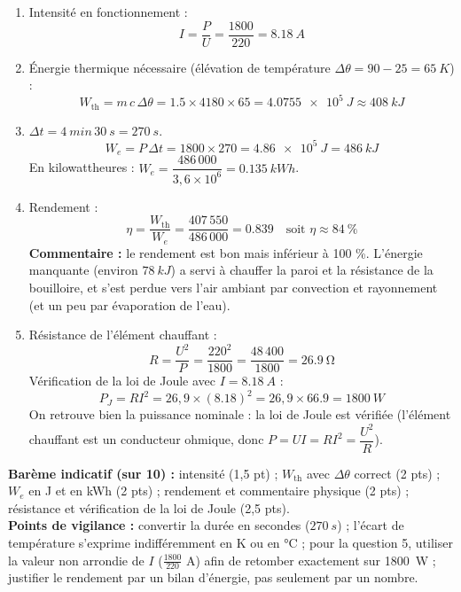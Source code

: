 \documentclass[11pt]{article}
\begin{document}
\begin{corrige}
\begin{enumerate}
\item Intensité en fonctionnement :
\[
I = \frac{P}{U} = \frac{1800}{220} = \SI{8,18}{A}
\]
\item Énergie thermique nécessaire (élévation de température $\Delta\theta = 90 - 25 = \SI{65}{K}$) :
\[
W_{\text{th}} = m\,c\,\Delta\theta = \num{1,5} \times 4180 \times 65 = \SI{4,0755e5}{J} \approx \SI{408}{kJ}
\]
\item $\Delta t = \SI{4}{min}\,\SI{30}{s} = \SI{270}{s}$.
\[
W_e = P\,\Delta t = 1800 \times 270 = \SI{4,86e5}{J} = \SI{486}{kJ}
\]
En kilowattheures : $W_e = \dfrac{486\,000}{3,6 \times 10^6} = \SI{0,135}{kWh}$.
\item Rendement :
\[
\eta = \frac{W_{\text{th}}}{W_e} = \frac{407\,550}{486\,000} = \num{0,839} \quad \text{soit } \eta \approx \SI{84}{\%}
\]
\textbf{Commentaire :} le rendement est bon mais inférieur à 100 \%. L'énergie manquante (environ $\SI{78}{kJ}$) a servi à chauffer la paroi et la résistance de la bouilloire, et s'est perdue vers l'air ambiant par convection et rayonnement (et un peu par évaporation de l'eau).
\item Résistance de l'élément chauffant :
\[
R = \frac{U^2}{P} = \frac{220^2}{1800} = \frac{48\,400}{1800} = \SI{26,9}{\ohm}
\]
Vérification de la loi de Joule avec $I = \SI{8,18}{A}$ :
\[
P_J = R I^2 = 26,9 \times (\num{8,18})^2 = 26,9 \times \num{66,9} = \SI{1800}{W}
\]
On retrouve bien la puissance nominale : la loi de Joule est vérifiée (l'élément chauffant est un conducteur ohmique, donc $P = U I = R I^2 = \dfrac{U^2}{R}$).
\end{enumerate}
\textbf{Barème indicatif (sur 10) :} intensité (1,5 pt) ; $W_{\text{th}}$ avec $\Delta\theta$ correct (2 pts) ; $W_e$ en J et en kWh (2 pts) ; rendement et commentaire physique (2 pts) ; résistance et vérification de la loi de Joule (2,5 pts).\\
\textbf{Points de vigilance :} convertir la durée en secondes ($\SI{270}{s}$) ; l'écart de température s'exprime indifféremment en K ou en \si{\celsius} ; pour la question 5, utiliser la valeur non arrondie de $I$ ($\tfrac{1800}{220}$ A) afin de retomber exactement sur \SI{1800}{W} ; justifier le rendement par un bilan d'énergie, pas seulement par un nombre.
\end{corrige}

\newpage
\end{document}
